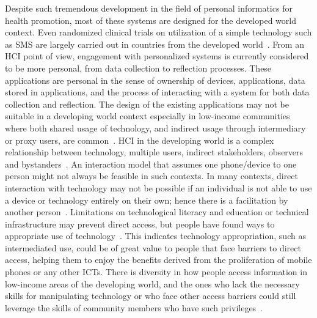 Despite such tremendous development in the field of personal informatics for health promotion, most of these systems are designed for the developed world context. Even randomized clinical trials on utilization of a simple technology such as SMS are largely carried out in countries from the developed world~\citep{cole2010text}. From an HCI point of view, engagement with personalized systems is currently considered to be more personal, from data collection to reflection processes. These applications are personal in the sense of ownership of devices, applications, data stored in applications, and the process of interacting with a system for both data collection and reflection. The design of the existing applications may not be suitable in a developing world context especially in low-income communities where  both shared usage of technology, and indirect usage through intermediary or proxy users, are common~\citep{kaplan2006can,sambasivan2010}. HCI in the developing world is a complex relationship between technology, multiple users, indirect stakeholders, observers and bystanders~\citep{parikh2006}. An interaction model that assumes one phone/device to one person might not always be feasible in such contexts. In many contexts, direct interaction with technology may not be possible if an individual is not able to use a device or technology entirely on their own; hence there is a facilitation by another person~\citep{sambasivan2010}. Limitations on technological literacy and education or technical infrastructure may  prevent direct access, but people have found ways to appropriate use of technology~\citep{parikh2006,smyth2010there,sambasivan2010human}. This indicates technology appropriation, such as intermediated use, could be of great value to people that face barriers to direct access, helping them to enjoy the benefits derived from the proliferation of mobile phones or any other ICTs. There is diversity in how people access information in low-income areas of the developing world, and the ones who lack the necessary skills for manipulating technology or who face other access barriers could still leverage the skills of community members who have such privileges~\citep{sambasivan2010}.

